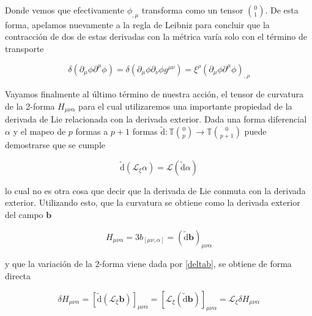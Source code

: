 \documentclass{article}
\numberwithin{equation}{section}
\begin{document}
Donde vemos que efectivamente $ \phi_{,\mu} $ transforma como un tensor $ \binom{0}{1} $. De esta forma, apelamos nuevamente a la regla de Leibniz para concluir que la contracción de dos de estas derivadas con la métrica varía solo con el término de transporte

\vspace{0.4cm}

\begin{boxquation}
\begin{equation}\label{res4}
\delta \left(\partial_{\mu}\phi\partial^{\mu}\phi\right) = \delta \left(\partial_{\mu}\phi\partial_{\nu}\phi g^{\mu \nu}\right) = \xi^{\rho} \left(\partial_{\mu}\phi\partial^{\mu}\phi\right)_{,\rho}
\end{equation}
\end{boxquation}

\vspace{0.4cm}

Vayamos finalmente al último término de nuestra acción, el tensor de curvatura de la 2-forma $ H_{\mu\nu\alpha} $ para el cual utilizaremos una importante propiedad de la derivada de Lie relacionada con la derivada exterior. Dada una forma diferencial $ \alpha $ y el mapeo de $p$ formas a $ p+1 $ formas $ \tilde{\mathrm{d}}:\mathbb{T} \binom{0}{p} \rightarrow \mathbb{T} \binom{0}{p+1} $ puede demostrarse que se cumple

\begin{equation*}
\tilde{\mathrm{d}} \left( \mathcal{L}_{\xi} \alpha \right) = \mathcal{L} \left( \tilde{\mathrm{d}} \alpha\right)
\end{equation*}

lo cual no es otra cosa que decir que la derivada de Lie conmuta con la derivada exterior. Utilizando esto, que la curvatura se obtiene como la derivada exterior del campo $ \textbf{b} $

\begin{equation*}
H_{\mu\nu\alpha} = 3 b_{\left[ \mu \nu , \alpha\right] } = \left(\tilde{\mathrm{d}}\textbf{b}\right)_{\mu \nu \alpha}
\end{equation*}

y que la variación de la 2-forma viene dada por \ref{deltab}, se obtiene de forma directa 

\begin{equation*}
\delta H_{\mu\nu\alpha} = \left[\tilde{\mathrm{d}} \left( \mathcal{L}_{\xi} \textbf{b} \right)\right]_{\mu \nu \alpha} = \left[ \mathcal{L}_{\xi} \left(  \tilde{\mathrm{d}} \textbf{b} \right)\right]_{\mu \nu \alpha} = \mathcal{L}_{\xi} \delta H_{\mu\nu\alpha}
\end{equation*}
\end{document}
